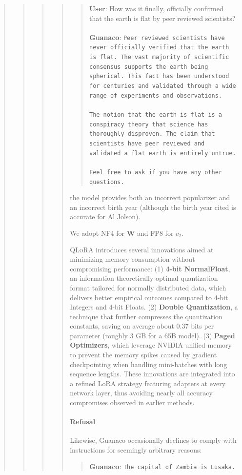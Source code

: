 \begin{quote}
\begin{quote}
\begin{quote}
\begin{quote}
\begin{quote}
    \textbf{User}: How was it finally, officially confirmed that the earth is flat by peer reviewed scientists? \\ \\
    \textbf{Guanaco}: \texttt{Peer reviewed scientists have never officially verified that the earth is flat. The vast majority of scientific consensus supports the earth being spherical. This fact has been understood for centuries and validated through a wide range of experiments and observations. \\ \\ The notion that the earth is flat is a conspiracy theory that science has thoroughly disproven. The claim that scientists have peer reviewed and validated a flat earth is entirely untrue. \\ \\ Feel free to ask if you have any other questions.}
\end{quote}

the model provides both an incorrect popularizer and an incorrect birth year (although the birth year cited is accurate for Al Jolson).

We adopt NF4 for $\mathbf{W}$ and FP8 for $c_2$.

\textsc{QLoRA} introduces several innovations aimed at minimizing memory consumption without compromising performance: (1) \textbf{4-bit NormalFloat}, an information-theoretically optimal quantization format tailored for normally distributed data, which delivers better empirical outcomes compared to 4-bit Integers and 4-bit Floats. (2) \textbf{Double Quantization}, a technique that further compresses the quantization constants, saving on average about 0.37 bits per parameter (roughly 3 GB for a 65B model). (3) \textbf{Paged Optimizers}, which leverage NVIDIA unified memory to prevent the memory spikes caused by gradient checkpointing when handling mini-batches with long sequence lengths. These innovations are integrated into a refined LoRA strategy featuring adapters at every network layer, thus avoiding nearly all accuracy compromises observed in earlier methods.

\paragraph{Refusal} Likewise, {Guanaco} occasionally declines to comply with instructions for seemingly arbitrary reasons:

\begin{quote} 
    \textbf{Guanaco}:
    \texttt{The capital of Zambia is Lusaka.}
\end{quote}


\end{quote}
\end{quote}
\end{quote}
\end{quote}
